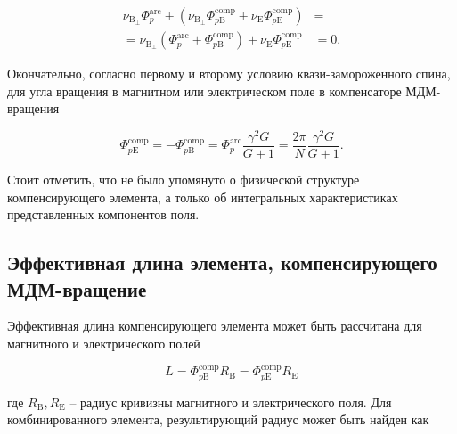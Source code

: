  \begin{equation}
	\begin{aligned}
		\nu_{\mathrm{B}_{\perp}}\Phi_{p}^{\text{arc}} +
		\left(\nu_{\mathrm{B}_{\perp}}\Phi_{p\mathrm{B}}^{\text{comp}} +
		\nu_{\mathrm{E}}\Phi_{p\mathrm{E}}^{\text{comp}} \right) & = \\
		= \nu_{\mathrm{B}_{\perp}} \left( 
		\Phi_{p}^{\text{arc}} +
		\Phi_{p\mathrm{B}}^{\text{comp}} \right) +
		\nu_{\mathrm{E}}\Phi_{p\mathrm{E}}^{\text{comp}}  & = 0.
		\label{eq:deflection}
	\end{aligned}
\end{equation}

\par Окончательно, согласно первому и второму условию квази-замороженного спина, для угла вращения в магнитном или электрическом поле в компенсаторе МДМ-вращения

\begin{equation}
	\Phi_{p\mathrm{E}}^{\textrm{comp}} = - \Phi_{p\mathrm{B}}^{\textrm{comp}} = {\Phi}_{p}^{\text{arc}}\frac{\gamma^2 G}{G+1} =\frac{2\pi}{N}\frac{\gamma^2 G}{G+1}.
	\label{eq:deflection}
\end{equation}

\noindent Стоит отметить, что не было упомянуто о физической структуре компенсирующего элемента, а только об интегральных характеристиках представленных компонентов поля.

	\subsection{Эффективная длина элемента, компенсирующего МДМ-вращение}\label{sec:EDM/requirements/length}
	
\par Эффективная длина компенсирующего элемента может быть рассчитана для магнитного и электрического полей

\begin{equation}
	L = \Phi_{p\mathrm{B}}^{\text{comp}}R_{\mathrm{B}} = \Phi_{p\mathrm{E}}^{\text{comp}}R_{\mathrm{E}}
	\label{eq:length}
\end{equation}

\noindent где $R_{\mathrm{B}}, R_{\mathrm{E}}$ -- радиус кривизны магнитного и электрического поля. Для комбинированного элемента, результирующий радиус может быть найден как
	
